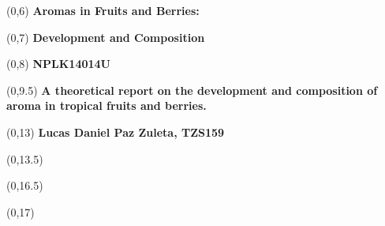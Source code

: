 \begin{titlepage}

    
    \begin{textblock}{9.4}(0,6)
        \Huge{\selectfont\bfseries{Aromas in Fruits and Berries: }}
    \end{textblock}
    \begin{textblock}{9.4}(0,7)
        \Huge{\selectfont\bfseries{Development and Composition}}
    \end{textblock}
    \begin{textblock}{9.4}(0,8)
        \Huge{\selectfont\bfseries{NPLK14014U}}
    \end{textblock}
    
    \begin{textblock}{9.4}(0,9.5)
        \LARGE{\selectfont\bfseries{A theoretical report on the development and composition of aroma in tropical fruits and berries.}}
    \end{textblock}
    
    \begin{textblock}{9.4}(0,13)
        \large{\selectfont\bfseries{
        Lucas Daniel Paz Zuleta, TZS159}}
    \end{textblock}
   
    
    \begin{textblock}{9.4}(0,13.5)
        \large{\selectfont{MSc students at the University of Copenhagen}}
    \end{textblock}
    
    \begin{textblock}{9.4}(0,16.5)
        \large{\selectfont{Last compiled: \today}}
    \end{textblock}
    
    \begin{textblock}{8.4}(0,17)
        \large{}
    \end{textblock}
    

\end{titlepage}
